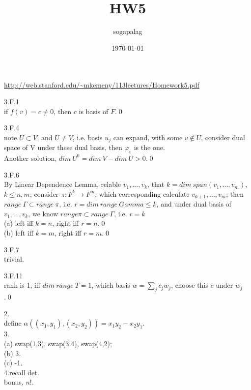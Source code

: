 \documentclass[paper=a4, fontsize=11pt]{scrartcl} %
\title{HW5}
\author{sogapalag}
\date{\normalsize\today}
\numberwithin{equation}{section} %
\numberwithin{figure}{section} %
\numberwithin{table}{section} %
\begin{document}
\maketitle 
\url{http://web.stanford.edu/~mkemeny/113lectures/Homework5.pdf}

3.F.1\\
if $f(v)=c\neq 0$, then $c$ is basis of $F$.\qed

3.F.4\\
note $U\subset V$, and $U\neq V$, i.e. basis $u_j$ can expand, with some $v\notin U$, consider dual space of V under these dual basis, then $\varphi_v$ is the one.\\
Another solution, $dim\ U^0 = dim\ V - dim\ U > 0$.\qed

3.F.6\\
By Linear Dependence Lemma, relable $v_1,...,v_k$, that $k=dim\ span(v_1,...,v_m)$, $k\leq n,m$; consider $\pi: F^k\rightarrow F^m$, which corresponding calculate $v_{k+1},...,v_m$; then $range\ \Gamma\subset range\ \pi$, i.e. $r = dim\ range\ Gamma \leq k$, and under dual basis of $v_1,...,v_k$, we know $range \pi\subset range\ \Gamma$, i.e. $r=k$\\
(a) left iff $k=n$, right iff $r=n$.\qed\\
(b) left iff $k=m$, right iff $r=m$.\qed

3.F.7\\
trivial.

3.F.11\\
rank is 1, iff $dim\ range\ T=1$, which basis $w=\sum_jc_jw_j$, choose this $c$ under $w_j$.\qed

2.\\
define $\alpha((x_1,y_1),(x_2,y_2)) = x_1y_2 - x_2y_1$.\\

3.\\
(a) swap(1,3), swap(3,4), swap(4,2);\\
(b) 3.\\
(c) -1.\\
4.recall det.\\
bonus, $n!$.
\end{document}
